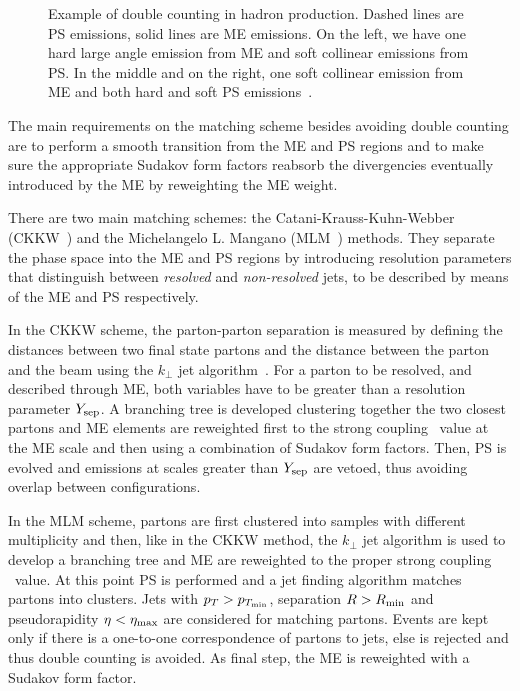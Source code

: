 \begin{figure}[htb]\begin{center}
	\caption{Example of double counting in hadron production. Dashed lines
        are PS emissions, solid lines are ME emissions. On the left, we have one
        hard large angle emission from ME and soft collinear emissions from PS.
        In the middle and on the right, one soft collinear emission from ME 
        and both hard and soft PS emissions~\cite{Ambroglini:2009nz}.
        \label{fig:matchfig1}}
\end{center}\end{figure}

The main requirements on the matching scheme besides avoiding double counting
are to perform a smooth transition from the ME and PS regions and to make
sure the appropriate Sudakov form factors reabsorb the divergencies eventually
introduced by the ME by reweighting the ME weight.

There are two main matching schemes: the Catani-Krauss-Kuhn-Webber 
(CKKW~\cite{Catani:2001cc}) and the Michelangelo L. Mangano 
(MLM~\cite{Mangano:2006rw}) methods.
They separate the phase space into the ME and PS regions by
introducing resolution parameters that distinguish between
{\it resolved} and {\it non-resolved} jets, to be described by
means of the ME and PS respectively.

In the CKKW scheme, the parton-parton separation is measured by defining
the distances between two final state partons and the distance between the 
parton and the beam using the $k_\perp$ jet algorithm~\cite{Catani1991432}. 
For a parton to be resolved, and described through ME,
both variables have to be greater than a resolution parameter $Y_{\rm sep}$. 
A branching tree is developed clustering together the two closest partons
and  ME elements are reweighted first to the strong coupling \alphas\ value 
at the ME scale and then using a combination of Sudakov form factors.
Then, PS is evolved and emissions at scales greater than 
$Y_{\rm sep}$ are vetoed, thus avoiding overlap between configurations. 

In the MLM scheme, partons are first clustered into samples with different 
multiplicity and then, like in the CKKW method, the $k_\perp$ jet algorithm
is used to develop a branching tree and ME are reweighted to the proper strong 
coupling \alphas\ value. At this point PS is performed and a jet finding algorithm
matches partons into clusters. Jets with 
$p_T>p_{T_{\rm min}}$, separation $R>R_{\rm min}$ and 
pseudorapidity $\eta<\eta_{\rm max}$ are considered for matching 
partons. Events are kept only if there is a one-to-one correspondence 
of partons to jets, else is rejected and thus double counting is avoided.
As final step, the ME is reweighted with a Sudakov form factor.

